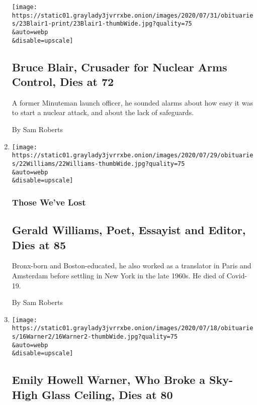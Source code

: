 \begin{enumerate}
  \texttt{[image: https://static01.graylady3jvrrxbe.onion/images/2020/07/31/obituaries/23Blair1-print/23Blair1-thumbWide.jpg?quality=75\\\&auto=webp\\\&disable=upscale]}

  \hypertarget{bruce-blair-crusader-for-nuclear-arms-control-dies-at-72}{%
  \subsection{Bruce Blair, Crusader for Nuclear Arms Control, Dies at
  72}\label{bruce-blair-crusader-for-nuclear-arms-control-dies-at-72}}

  A former Minuteman launch officer, he sounded alarms about how easy it
  was to start a nuclear attack, and about the lack of safeguards.

  By Sam Roberts
\item
  \href{/2020/07/23/obituaries/gerald-williams-dead-coronavirus.html}{}

  \texttt{[image: https://static01.graylady3jvrrxbe.onion/images/2020/07/29/obituaries/22Williams/22Williams-thumbWide.jpg?quality=75\\\&auto=webp\\\&disable=upscale]}

  \hypertarget{those-weve-lost-1}{%
  \subsubsection{Those We've Lost}\label{those-weve-lost-1}}

  \hypertarget{gerald-williams-poet-essayist-and-editor-dies-at-85}{%
  \subsection{Gerald Williams, Poet, Essayist and Editor, Dies at
  85}\label{gerald-williams-poet-essayist-and-editor-dies-at-85}}

  Bronx-born and Boston-educated, he also worked as a translator in
  Paris and Amsterdam before settling in New York in the late 1960s. He
  died of Covid-19.

  By Sam Roberts
\item
  \href{/2020/07/17/us/emily-howell-warner-dead.html}{}

  \texttt{[image: https://static01.graylady3jvrrxbe.onion/images/2020/07/18/obituaries/16Warner2/16Warner2-thumbWide.jpg?quality=75\\\&auto=webp\\\&disable=upscale]}

  \hypertarget{emily-howell-warner-who-broke-a-sky-high-glass-ceiling-dies-at-80}{%
  \subsection{Emily Howell Warner, Who Broke a Sky-High Glass Ceiling,
  Dies at
  80}\label{emily-howell-warner-who-broke-a-sky-high-glass-ceiling-dies-at-80}}


\end{enumerate}
